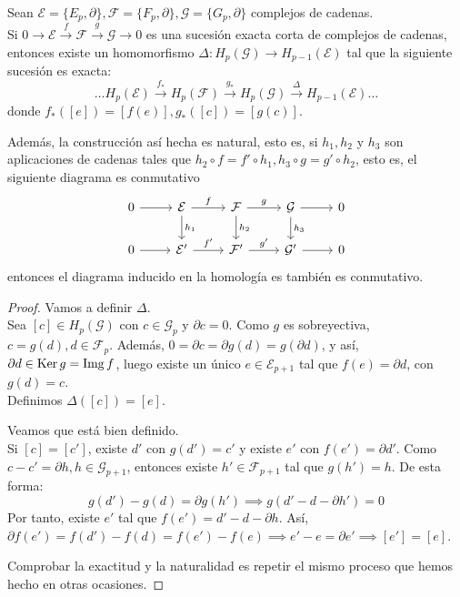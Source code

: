 \begin{theorem}
  Sean $\mathcal{E} = \{E_p, \partial\}, \mathcal{F} = \{F_p, \partial\}, \mathcal{G} = \{G_p, \partial\}$ complejos de cadenas. \\
  Si $0 \to \mathcal{E} \xrightarrow{f} \mathcal{F} \xrightarrow{g} \mathcal{G} \to 0$ es una sucesión exacta corta de complejos
  de cadenas, entonces existe un homomorfismo $\Delta \colon H_p(\mathcal{G}) \to H_{p-1}(\mathcal{E})$ tal que la siguiente
  sucesión es exacta:
  \[ \dots H_p(\mathcal{E}) \xrightarrow{f_*} H_p(\mathcal{F}) \xrightarrow{g_*} H_p(\mathcal{G}) \xrightarrow{\Delta} H_{p-1}(\mathcal{E}) \dots \]
  donde $f_*([e]) = [f(e)], g_*([c]) = [g(c)]$.

  Además, la construcción así hecha es natural, esto es, si $h_1, h_2$ y $h_3$ son aplicaciones de cadenas tales que
  $h_2 \circ f = f' \circ h_1, h_3 \circ g = g' \circ h_2$, esto es, el siguiente diagrama es conmutativo
  \[ \begin{tikzcd}
    0 \arrow{r} & \mathcal{E} \arrow{r}{f} \arrow{d}{h_1} & \mathcal{F} \arrow{r}{g} \arrow{d}{h_2} & \mathcal{G} \arrow{r} \arrow{d}{h_3} & 0 \\
    0 \arrow{r} & \mathcal{E'} \arrow{r}{f'} & \mathcal{F'} \arrow{r}{g'} & \mathcal{G'} \arrow{r} & 0
  \end{tikzcd} \]
  entonces el diagrama inducido en la homología es también es conmutativo.
\end{theorem}

\begin{proof}
  Vamos a definir $\Delta$. \\
  Sea $[c] \in H_p(\mathcal G)$ con $c \in \mathcal G_p$ y $\partial c = 0$. Como $g$ es sobreyectiva, $c = g(d), d \in \mathcal F_p$.
  Además, $0 = \partial c = \partial g(d) = g(\partial d)$, y así, $\partial d \in \operatorname{Ker} g = \operatorname{Img} f$, luego existe un único $e \in \mathcal E_{p+1}$
  tal que $f(e) = \partial d$, con $g(d) = c$. \\
  Definimos $\Delta([c]) = [e]$.

  Veamos que está bien definido. \\
  Si $[c] = [c']$, existe $d'$ con $g(d') = c'$ y existe $e'$ con $f(e') = \partial d'$. Como $c - c' = \partial h, h \in \mathcal G_{p+1}$,
  entonces existe $h' \in \mathcal F_{p+1}$ tal que $g(h') = h$. De esta forma:
  \[ g(d') - g(d) = \partial g(h') \implies g(d' - d - \partial h') = 0 \]
  Por tanto, existe $e'$ tal que $f(e') = d' - d - \partial h$. Así, $\partial f(e') = f(d') - f(d) = f(e') - f(e) \implies e' - e = \partial e'
  \implies [e'] = [e]$.

  Comprobar la exactitud y la naturalidad es repetir el mismo proceso que hemos hecho en otras ocasiones.
\end{proof}

